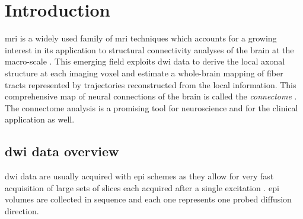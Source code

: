 \section{Introduction}
\label{sec:introduction}

 \gls{mri} is a widely used family
of \gls{mri} techniques \citep{sundgren_diffusion_2004} which 
accounts for a growing interest in its application to structural 
connectivity analyses of the brain at the macro-scale
\citep{craddock_imaging_2013}. This emerging field exploits
\gls{dwi} data to derive the local axonal structure at each imaging voxel 
\citep{basser_microstructural_2011} and estimate a whole-brain mapping of fiber 
tracts \citep{hagmann_mr_2012,johansen-berg_using_2009} represented by 
trajectories reconstructed from the local information.
This comprehensive map of neural connections of the brain is called the 
\emph{connectome} \citep{hagmann_diffusion_2005,sporns_human_2005}. The connectome
analysis is a promising tool for neuroscience \citep{morgan_why_2013} and 
for the clinical application \citep{griffa_structural_2013} as well.



\subsection{\Gls{dwi} data overview}
\label{sec:dwi_overview}
\gls{dwi} data are usually acquired with \gls{epi} schemes
as they allow for very fast acquisition of large sets of slices each
acquired after a single excitation \citep{mukherjee_diffusion_2008,
soares_hitchhikers_2013}. \Gls{epi} volumes are collected
in sequence and each one represents one probed diffusion direction.

